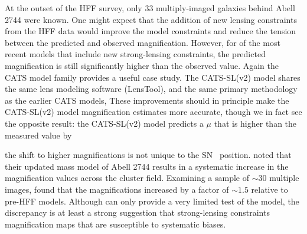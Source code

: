 At the outset of the HFF survey, only 33 multiply-imaged galaxies
behind Abell 2744 were known.  One might expect that the addition of
new lensing constraints from the HFF data would improve the model
constraints and reduce the tension between the predicted and observed
magnification.  However, for  of the most recent
models \citep{Jauzac:2014c,Lam:2014} that include new strong-lensing
constraints, the predicted magnification is still significantly higher
than the observed value.  Again the CATS model family provides a
useful case study.  The CATS-SL(v2) model \citep[from][]{Jauzac:2014c}
shares the same lens modeling software (LensTool), and the same
primary methodology as the earlier CATS models,   These improvements
should in principle make the CATS-SL(v2) model magnification estimates
more accurate, though we in fact see the opposite result: the
CATS-SL(v2) model predicts a $\mu$ that is higher than the measured
value by 


 the shift to higher magnifications is not unique to the
SN \tomas\ position.  \citet{Jauzac:2014c} noted that their updated
mass model of Abell 2744 results in a systematic increase in the
magnification values across the cluster field. Examining a sample of
$\sim$30 multiple images, \citeauthor{Jauzac:2014c} found that the
magnifications increased by a factor of $\sim1.5$ relative to pre-HFF
models.  Although  can
only provide a very limited test of the model,
the \changeR{$4.1\sigma$} discrepancy is at least a strong suggestion
that  strong-lensing
constraints  magnification
maps that are susceptible to systematic biases.


